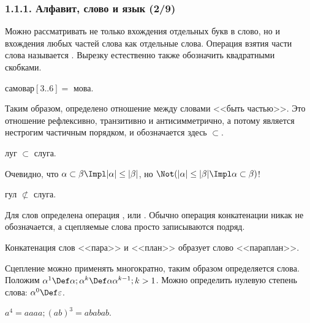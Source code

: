 \begin{frame}
\frametitle{1.1.1. Алфавит, слово и язык (2/9)}
Можно рассматривать не только вхождения
отдельных букв в слово, но и 
вхождения любых частей слова как отдельные слова.
Операция взятия части слова называется 
.
Вырезку естественно также обозначить 
квадратными скобками. 
\begin{example}
самовар$[3..6]= $ мова.
\end{example}

Таким образом, определено отношение 
между словами <<быть частью>>.
Это отношение рефлексивно, транзитивно и антисимметрично,
а потому является нестрогим частичным порядком,
и обозначается здесь $\subset$.
\begin{example}
луг $\subset$ слуга.
\end{example}

\begin{remark} Очевидно, что 
$\alpha\subset\beta\Impl|\alpha|\le|\beta|$,
но $\Not(|\alpha|\le|\beta|\Impl\alpha\subset\beta)$!
\end{remark} 
\begin{example}
гул $\not\subset$ слуга.
\end{example}

Для слов определена операция 
, 
или .
Обычно операция конкатенации никак не обозначается, а сцепляемые слова 
просто записываются подряд. 

\begin{example}
Конкатенация слов <<пара>> и <<план>> образует слово <<параплан>>.
\end{example}

Сцепление можно применять многократно,
таким образом определяется  слова. Положим
$\alpha^1 \Def \alpha; \alpha^k\Def\alpha\alpha^{k-1}; k>1$. Можно 
определить нулевую степень слова:
$\alpha^0 \Def \varepsilon$.

\begin{example}
$a^4=aaaa; (ab)^3= ababab$.
\end{example}

\end{frame}



